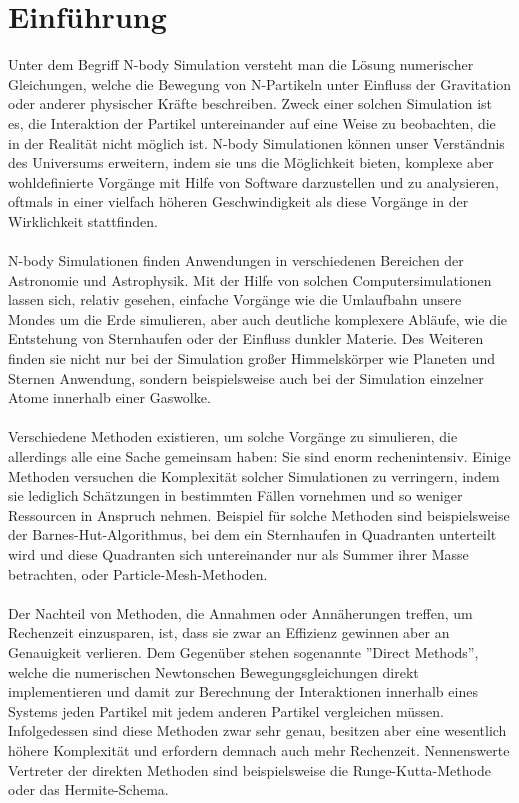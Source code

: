 \documentclass[
	12pt,
	a4paper,
	BCOR10mm,
	DIV14,
	headsepline,
	usegeometry,
]{scrreprt}
\begin{document}
\chapter{Einführung}
Unter dem Begriff N-body Simulation versteht man die Lösung numerischer Gleichungen, welche die Bewegung von N-Partikeln unter Einfluss der Gravitation oder anderer physischer Kräfte beschreiben. Zweck einer solchen Simulation ist es, die Interaktion der Partikel untereinander auf eine Weise zu beobachten, die in der Realität nicht möglich ist. N-body Simulationen können unser Verständnis des Universums erweitern, indem sie uns die Möglichkeit bieten, komplexe aber wohldefinierte Vorgänge mit Hilfe von Software darzustellen und zu analysieren, oftmals in einer vielfach höheren Geschwindigkeit als diese Vorgänge in der Wirklichkeit stattfinden. \\\\ N-body Simulationen finden Anwendungen in verschiedenen Bereichen der Astronomie und Astrophysik. Mit der Hilfe von solchen Computersimulationen lassen sich, relativ gesehen, einfache Vorgänge wie die Umlaufbahn unsere Mondes um die Erde simulieren, aber auch deutliche komplexere Abläufe, wie die Entstehung von Sternhaufen oder der Einfluss dunkler Materie. Des Weiteren finden sie nicht nur bei der Simulation großer Himmelskörper wie Planeten und Sternen Anwendung, sondern beispielsweise auch bei der Simulation einzelner Atome innerhalb einer Gaswolke. \\\\ Verschiedene Methoden existieren, um solche Vorgänge zu simulieren, die allerdings alle eine Sache gemeinsam haben: Sie sind enorm rechenintensiv. Einige Methoden versuchen die Komplexität solcher Simulationen zu verringern, indem sie lediglich Schätzungen in bestimmten Fällen vornehmen und so weniger Ressourcen in Anspruch nehmen. Beispiel für solche Methoden sind beispielsweise der Barnes-Hut-Algorithmus, bei dem ein Sternhaufen in Quadranten unterteilt wird und diese Quadranten sich untereinander nur als Summer ihrer Masse betrachten, oder Particle-Mesh-Methoden. \\\\ Der Nachteil von Methoden, die Annahmen oder Annäherungen treffen, um Rechenzeit einzusparen, ist, dass sie zwar an Effizienz gewinnen aber an Genauigkeit verlieren. Dem Gegenüber stehen sogenannte ''Direct Methods'', welche die numerischen Newtonschen Bewegungsgleichungen direkt implementieren und damit zur Berechnung der Interaktionen innerhalb eines Systems jeden Partikel mit jedem anderen Partikel vergleichen müssen. Infolgedessen sind diese Methoden zwar sehr genau, besitzen aber eine wesentlich höhere Komplexität und erfordern demnach auch mehr Rechenzeit. Nennenswerte Vertreter der direkten Methoden sind beispielsweise die Runge-Kutta-Methode oder das Hermite-Schema.
\end{document}
